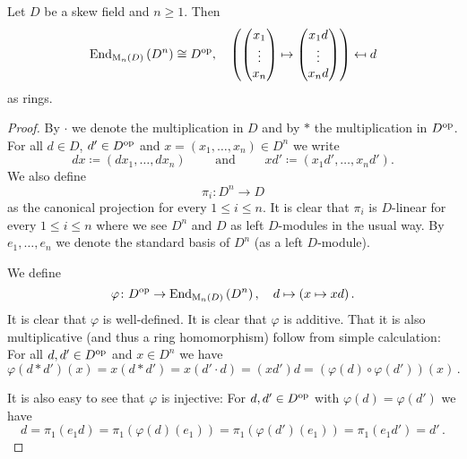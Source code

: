 \begin{lem}
  Let $D$ be a skew field and $n \geq 1$. Then
  \[
              \operatorname{End}_{\operatorname{M}_n(D)}\left(D^n\right)
    \cong     D^{\mathrm{op}},
    \quad     \left(
                        \begin{pmatrix}x_1 \\ \vdots \\ x_n\end{pmatrix}
                \mapsto \begin{pmatrix}x_1 d \\ \vdots \\ x_n d\end{pmatrix}
              \right)
    \mapsfrom d
  \]
  as rings.
\end{lem}
\begin{proof}
  By $\cdot$ we denote the multiplication in $D$ and by $*$ the multiplication in $D^{\mathrm{op}}$.
  For all $d \in D$, $d' \in D^{\mathrm{op}}$ and $x = (x_1, \dotsc, x_n) \in D^n$ we write
  \[
              d x
    \coloneqq (d x_1, \dotsc, d x_n)
    \qquad \text{ and } \qquad
              x d'
    \coloneqq (x_1 d', \dotsc, x_n d'). 
  \]
  We also define
  \[
    \pi_i \colon D^n \to D
  \]
  as the canonical projection for every $1 \leq i \leq n$.
  It is clear that $\pi_i$ is $D$-linear for every $1 \leq i \leq n$ where we see $D^n$ and $D$ as left $D$-modules in the usual way.
  By $e_1, \dotsc, e_n$ we denote the standard basis of $D^n$ (as a left $D$-module).
  
  We define
  \[
            \varphi
    \colon  D^{\mathrm{op}}
    \to     \operatorname{End}_{\operatorname{M}_n(D)}\left( D^n \right),
    \quad   d
    \mapsto (x \mapsto x d) \,.
  \]
  It is clear that $\varphi$ is well-defined.
  It is clear that $\varphi$ is additive.
  That it is also multiplicative (and thus a ring homomorphism) follow from simple calculation:
  For all $d, d' \in D^{\mathrm{op}}$ and $x \in D^n$ we have
  \[
      \varphi(d * d')(x)
    = x (d * d')
    = x (d' \cdot d)
    = (x d') d
    = \left( \varphi(d) \circ \varphi(d') \right)(x) \,.
  \]
  
  It is also easy to see that $\varphi$ is injective:
  For $d, d' \in D^{\mathrm{op}}$ with $\varphi(d) = \varphi(d')$ we have
  \[
      d
    = \pi_1(e_1 d)
    = \pi_1(\varphi(d)(e_1))
    = \pi_1(\varphi(d')(e_1))
    = \pi_1(e_1 d')
    = d' \,.
  \]
  

\end{proof}
